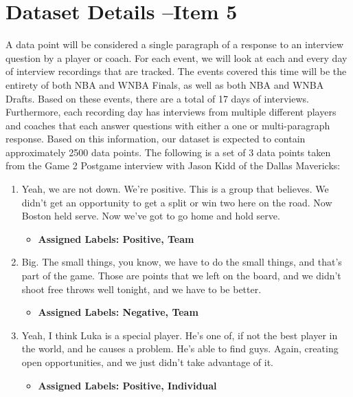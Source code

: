 \documentclass[titlepage]{article}
\begin{document}
\section{Dataset Details --Item 5}
\indent A data point will be considered a single paragraph of a response to an interview question by a player or coach. 
For each event, we will look at each and every day of interview recordings that are tracked. The events covered 
this time will be the entirety of both NBA and WNBA Finals, as well as both NBA and WNBA Drafts. Based on these 
events, there are a total of 17 days of interviews. Furthermore, each recording day has interviews from multiple 
different players and coaches that each answer questions with either a one or multi-paragraph response. Based on 
this information, our dataset is expected to contain approximately 2500 data points.
\newline \newline
\indent The following is a set of 3 data points taken from the Game 2 Postgame interview with Jason Kidd of the Dallas 
Mavericks:
\begin{enumerate}
    \item Yeah, we are not down. We're positive. This is a group that believes. We didn't get an opportunity to get a 
    split or win two here on the road. Now Boston held serve. Now we've got to go home and hold serve.
    \begin{itemize}
        \item \textbf{Assigned Labels: Positive, Team}
    \end{itemize}

    \item Big. The small things, you know, we have to do the small things, and that's part of the game. Those are points 
    that we left on the board, and we didn't shoot free throws well tonight, and we have to be better.
    \begin{itemize}
        \item \textbf{Assigned Labels: Negative, Team}
    \end{itemize}

    \item Yeah, I think Luka is a special player. He's one of, if not the best player in the world, and he causes a problem. 
    He's able to find guys. Again, creating open opportunities, and we just didn't take advantage of it.
    \begin{itemize}
        \item \textbf{Assigned Labels: Positive, Individual}
    \end{itemize}
\end{enumerate}
\end{document}
